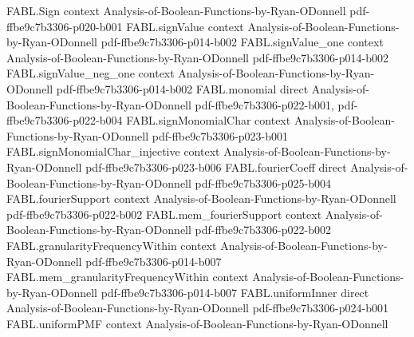 \begin{theorem}
\label{FABL.FiniteFourierBasis.productInfluence_eq_expect_coordinateConditionalVariance}
\leanok
{}
\proofstep
  {FABL.Sign}
  {context}
  {Analysis-of-Boolean-Functions-by-Ryan-ODonnell}
  {pdf-ffbe9c7b3306-p020-b001}
\proofstep
  {FABL.signValue}
  {context}
  {Analysis-of-Boolean-Functions-by-Ryan-ODonnell}
  {pdf-ffbe9c7b3306-p014-b002}
\proofstep
  {FABL.signValue_one}
  {context}
  {Analysis-of-Boolean-Functions-by-Ryan-ODonnell}
  {pdf-ffbe9c7b3306-p014-b002}
\proofstep
  {FABL.signValue_neg_one}
  {context}
  {Analysis-of-Boolean-Functions-by-Ryan-ODonnell}
  {pdf-ffbe9c7b3306-p014-b002}
\proofstep
  {FABL.monomial}
  {direct}
  {Analysis-of-Boolean-Functions-by-Ryan-ODonnell}
  {pdf-ffbe9c7b3306-p022-b001,
    pdf-ffbe9c7b3306-p022-b004}
\proofstep
  {FABL.signMonomialChar}
  {context}
  {Analysis-of-Boolean-Functions-by-Ryan-ODonnell}
  {pdf-ffbe9c7b3306-p023-b001}
\proofstep
  {FABL.signMonomialChar_injective}
  {context}
  {Analysis-of-Boolean-Functions-by-Ryan-ODonnell}
  {pdf-ffbe9c7b3306-p023-b006}
\proofstep
  {FABL.fourierCoeff}
  {direct}
  {Analysis-of-Boolean-Functions-by-Ryan-ODonnell}
  {pdf-ffbe9c7b3306-p025-b004}
\proofstep
  {FABL.fourierSupport}
  {context}
  {Analysis-of-Boolean-Functions-by-Ryan-ODonnell}
  {pdf-ffbe9c7b3306-p022-b002}
\proofstep
  {FABL.mem_fourierSupport}
  {context}
  {Analysis-of-Boolean-Functions-by-Ryan-ODonnell}
  {pdf-ffbe9c7b3306-p022-b002}
\proofstep
  {FABL.granularityFrequencyWithin}
  {context}
  {Analysis-of-Boolean-Functions-by-Ryan-ODonnell}
  {pdf-ffbe9c7b3306-p014-b007}
\proofstep
  {FABL.mem_granularityFrequencyWithin}
  {context}
  {Analysis-of-Boolean-Functions-by-Ryan-ODonnell}
  {pdf-ffbe9c7b3306-p014-b007}
\proofstep
  {FABL.uniformInner}
  {direct}
  {Analysis-of-Boolean-Functions-by-Ryan-ODonnell}
  {pdf-ffbe9c7b3306-p024-b001}
\proofstep
  {FABL.uniformPMF}
  {context}
  {Analysis-of-Boolean-Functions-by-Ryan-ODonnell}

\end{theorem}
